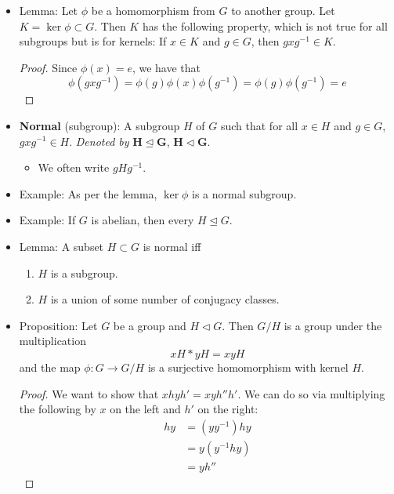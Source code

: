 \documentclass[../notes.tex]{subfiles}
\begin{document}
\begin{itemize}
\begin{itemize}
    \end{itemize}
    \item Lemma: Let $\phi$ be a homomorphism from $G$ to another group. Let $K=\ker\phi\subset G$. Then $K$ has the following property, which is not true for all subgroups but is for kernels: If $x\in K$ and $g\in G$, then $gxg^{-1}\in K$.
    \begin{proof}
        Since $\phi(x)=e$, we have that
        \begin{equation*}
            \phi(gxg^{-1}) = \phi(g)\phi(x)\phi(g^{-1})
            = \phi(g)\phi(g^{-1})
            = e
        \end{equation*}
    \end{proof}
    \item \textbf{Normal} (subgroup): A subgroup $H$ of $G$ such that for all $x\in H$ and $g\in G$, $gxg^{-1}\in H$. \emph{Denoted by} $\bm{H\trianglelefteq G}$, $\bm{H\triangleleft G}$.
    \begin{itemize}
        \item We often write $gHg^{-1}$.
    \end{itemize}
    \item Example: As per the lemma, $\ker\phi$ is a normal subgroup.
    \item Example: If $G$ is abelian, then every $H\trianglelefteq G$.
    \item Lemma: A subset $H\subset G$ is normal iff
    \begin{enumerate}
        \item $H$ is a subgroup.
        \item $H$ is a union of some number of conjugacy classes.
    \end{enumerate}
    \item Proposition: Let $G$ be a group and $H\triangleleft G$. Then $G/H$ is a group under the multiplication
    \begin{equation*}
        xH*yH = xyH
    \end{equation*}
    and the map $\phi:G\to G/H$ is a surjective homomorphism with kernel $H$.
    \begin{proof}
        We want to show that $xhyh'=xyh''h'$. We can do so via multiplying the following by $x$ on the left and $h'$ on the right:
        \begin{align*}
            hy &= (yy^{-1})hy\\
            &= y(y^{-1}hy)\\
            &= yh''
        \end{align*}

\end{proof}
\end{itemize}
\end{document}
